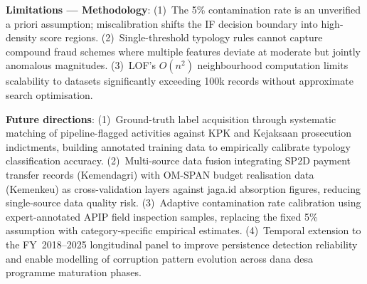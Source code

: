 \documentclass[3p,times,procedia]{elsarticle}
\begin{document}
\textbf{Limitations --- Methodology}: (1)~The 5\% contamination rate is an unverified a priori assumption; miscalibration shifts the IF decision boundary into high-density score regions. (2)~Single-threshold typology rules cannot capture compound fraud schemes where multiple features deviate at moderate but jointly anomalous magnitudes. (3)~LOF's $O(n^2)$ neighbourhood computation limits scalability to datasets significantly exceeding 100k records without approximate search optimisation.

\textbf{Future directions}: (1)~Ground-truth label acquisition through systematic matching of pipeline-flagged activities against KPK and Kejaksaan prosecution indictments, building annotated training data to empirically calibrate typology classification accuracy. (2)~Multi-source data fusion integrating SP2D payment transfer records (Kemendagri) with OM-SPAN budget realisation data (Kemenkeu) as cross-validation layers against jaga.id absorption figures, reducing single-source data quality risk. (3)~Adaptive contamination rate calibration using expert-annotated APIP field inspection samples, replacing the fixed 5\% assumption with category-specific empirical estimates. (4)~Temporal extension to the FY~2018--2025 longitudinal panel to improve persistence detection reliability and enable modelling of corruption pattern evolution across dana desa programme maturation phases.
\end{document}
